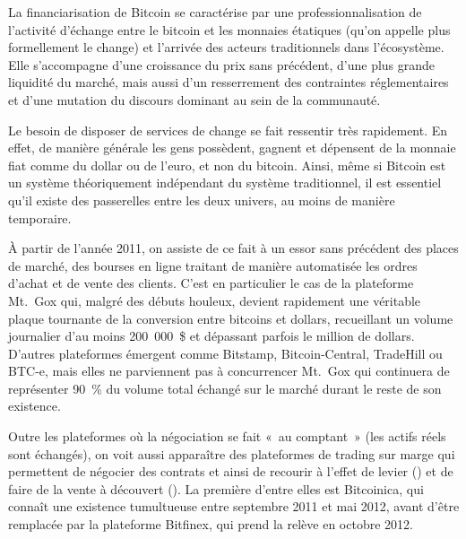 La financiarisation de Bitcoin se caractérise par une professionnalisation de l'activité d'échange entre le bitcoin et les monnaies étatiques (qu'on appelle plus formellement le change) et l'arrivée des acteurs traditionnels dans l'écosystème. Elle s'accompagne d'une croissance du prix sans précédent, d'une plus grande liquidité du marché, mais aussi d'un resserrement des contraintes réglementaires et d'une mutation du discours dominant au sein de la communauté.


Le besoin de disposer de services de change se fait ressentir très rapidement. En effet, de manière générale les gens possèdent, gagnent et dépensent de la monnaie fiat comme du dollar ou de l'euro, et non du bitcoin. Ainsi, même si Bitcoin est un système théoriquement indépendant du système traditionnel, il est essentiel qu'il existe des passerelles entre les deux univers, au moins de manière temporaire.

À partir de l'année 2011, on assiste de ce fait à un essor sans précédent des places de marché, des bourses en ligne traitant de manière automatisée les ordres d'achat et de vente des clients. C'est en particulier le cas de la plateforme Mt.~Gox qui, malgré des débuts houleux, devient rapidement une véritable plaque tournante de la conversion entre bitcoins et dollars, recueillant un volume journalier d'au moins 200~000~\$ et dépassant parfois le million de dollars. D'autres plateformes émergent comme Bitstamp, Bitcoin-Central, TradeHill ou BTC-e, mais elles ne parviennent pas à concurrencer Mt.~Gox qui continuera de représenter 90~\% du volume total échangé sur le marché durant le reste de son existence. %

Outre les plateformes où la négociation se fait «~au comptant~» (les actifs réels sont échangés), on voit aussi apparaître des plateformes de trading sur marge qui permettent de négocier des contrats et ainsi de recourir à l'effet de levier () et de faire de la vente à découvert (). La première d'entre elles est Bitcoinica, qui connaît une existence tumultueuse entre septembre 2011 et mai 2012, avant d'être remplacée par la plateforme Bitfinex, qui prend la relève en octobre 2012.

